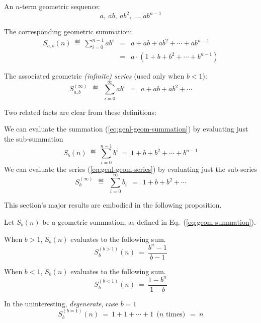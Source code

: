 \medskip

An $n$-term geometric sequence:
\begin{equation}
\label{eq:genl-geom-seq}
a, \ ab, \ ab^2, \ \ldots, ab^{n-1}
\end{equation}

The corresponding geometric summation:
\begin{eqnarray}
\label{eq:genl-geom-summation}
S_{a,b}(n)
 \ \eqdef \  \sum_{i=0}^{n-1} a b^i 
 & = &  a + ab + ab^2 + \cdots + ab^{n-1} \\
\nonumber
 & = & 
 a \cdot (1+ b + b^2 + \cdots + b^{n-1})
\end{eqnarray}

The associated geometric {\em (infinite) series} (used only when $b < 1$):
\begin{equation}
\label{eq:genl-geom-series}
S_{a,b}^{(\infty)} \ \ \eqdef \ \  \sum_{i=0}^\infty a b^i
 \ \  = \ \   a + ab + ab^2 + \cdots 
\end{equation}

\medskip

\noindent
Two related facts are clear from these definitions:

\noindent
We can evaluate the summation (\ref{eq:genl-geom-summation}) by evaluating just the sub-summation
\begin{equation}
\label{eq:geom-summation}
S_{b}(n) \ \eqdef \ \sum_{i=0}^{n-1} b^i \ = \ 1+ b + b^2 + \cdots + b^{n-1}
\end{equation}
We can evaluate the series (\ref{eq:genl-geom-series}) by evaluating just the sub-series
\begin{equation}
\label{eq:geom-series}
S_{b}^{(\infty)} \ \ \eqdef \ \ \sum_{i=0}^\infty b_i \ \ = \ \ 1+ b + b^2 + \cdots 
\end{equation}

\bigskip

This section's major results are embodied in the following proposition.

\begin{prop}
\label{thm:sum-finite-geometric-series}
Let $S_{b}(n)$ be a geometric summation, as defined in Eq.~(\ref{eq:geom-summation}).

\smallskip

When $b > 1$, $S_{b}(n)$ evaluates to the following sum.
\begin{equation}
\label{eq:geom-sum:b>1}
S^{(b>1)}_{b}(n) \ = \ \frac{b^{n}- 1}{b - 1}
\end{equation}

\smallskip

When $b < 1$, $S_{b}(n)$ evaluates to the following sum.
\begin{equation}
\label{eq:geom-sum:b<1}
S^{(b<1)}_{b}(n) \ = \ \frac{1 - b^n}{1-b}
\end{equation}

\smallskip

In the uninteresting, {\em degenerate}, case $b=1$
\[ S^{(b=1)}_{b}(n) \ = \ 1 + 1 + \cdots + 1 \ \ \mbox{($n$ times)} \ \ = \ n \]
\end{prop}

